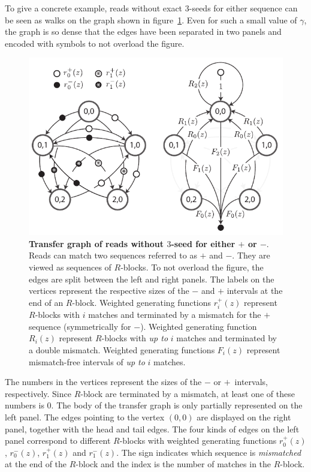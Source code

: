 \documentclass{article}
\begin{document}
To give a concrete example, reads without exact $3$-seeds for either
sequence can be seen as walks on the graph shown in
figure~\ref{fig:graph_fp}. Even for such a small value of $\gamma$, the
graph is so dense that the edges have been separated in two panels and
encoded with symbols to not overload the figure.

\begin{figure}[h]
\centering
\includegraphics[scale=1]{false_positives_graph.pdf}
\caption{\textbf{Transfer graph of reads without $3$-seed for either
$+$ or $-$}. Reads can match two sequences referred to as $+$ and $-$.
They are viewed as sequences of $R$-blocks. To not overload the figure,
the edges are split between the left and right panels. The labels on the
vertices represent the respective sizes of the $-$ and $+$ intervals at
the end of an $R$-block. Weighted generating functions $r_i^+(z)$
represent $R$-blocks with $i$ matches and terminated by a mismatch for the
$+$ sequence (symmetrically for $-$). Weighted generating function
$R_i(z)$ represent $R$-blocks with \emph{up to} $i$ matches and terminated
by a double mismatch. Weighted generating functions $F_i(z)$ represent
mismatch-free intervals of \emph{up to} $i$ matches.}
\label{fig:graph_fp}
\end{figure}

The numbers in the vertices represent the sizes of the $-$ or
$+$~intervals, respectively. Since $R$-block are terminated by a mismatch,
at least one of these numbers is $0$. The body of the transfer graph is
only partially represented on the left panel. The edges pointing to the
vertex $(0,0)$ are displayed on the right panel, together with the head
and tail edges. The four kinds of edges on the left panel correspond to
different $R$-blocks with weighted generating functions $r_0^+(z)$,
$r_0^-(z)$, $r_1^+(z)$ and $r_1^-(z)$. The sign indicates which sequence
is \emph{mismatched} at the end of the $R$-block and the index is the
number of matches in the $R$-block.
\end{document}
